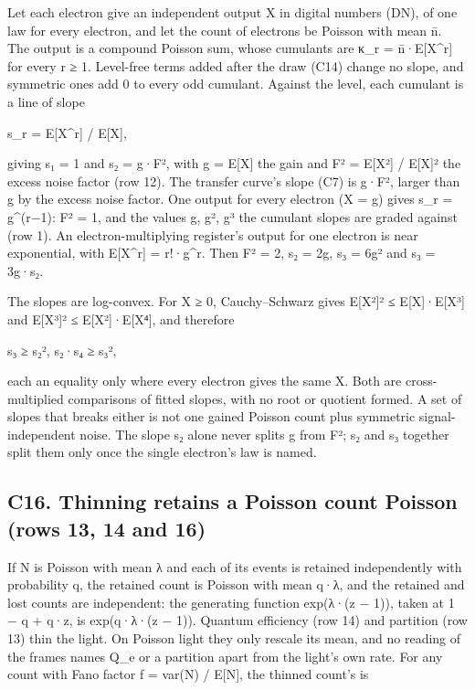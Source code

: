 Let each electron give an independent output X in digital numbers (DN), of one law for every electron, and let the count of electrons be Poisson with mean n̄. The output is a compound Poisson sum, whose cumulants are κ\_\allowbreak{}r = n̄·E[X\textasciicircum{}r] for every r ≥ 1. Level-free terms added after the draw (C14) change no slope, and symmetric ones add 0 to every odd cumulant. Against the level, each cumulant is a line of slope

s\_\allowbreak{}r = E[X\textasciicircum{}r] / E[X],

giving s₁ = 1 and s₂ = g·F², with g = E[X] the gain and F² = E[X²] / E[X]² the excess noise factor (row 12). The transfer curve's slope (C7) is g·F², larger than g by the excess noise factor. One output for every electron (X = g) gives s\_\allowbreak{}r = g\textasciicircum{}(r−1): F² = 1, and the values g, g², g³ the cumulant slopes are graded against (row 1). An electron-multiplying register's output for one electron is near exponential, with E[X\textasciicircum{}r] = r!·g\textasciicircum{}r. Then F² = 2, s₂ = 2g, s₃ = 6g² and s₃ = 3g·s₂.

The slopes are log-convex. For X ≥ 0, Cauchy–Schwarz gives E[X²]² ≤ E[X]·E[X³] and E[X³]² ≤ E[X²]·E[X⁴], and therefore

s₃ ≥ s₂²,  s₂·s₄ ≥ s₃²,

each an equality only where every electron gives the same X. Both are cross-multiplied comparisons of fitted slopes, with no root or quotient formed. A set of slopes that breaks either is not one gained Poisson count plus symmetric signal-independent noise. The slope s₂ alone never splits g from F²; s₂ and s₃ together split them only once the single electron's law is named.

\subsection{\texorpdfstring{C16. Thinning retains a Poisson count Poisson (rows 13, 14 and 16)}{C16. Thinning retains a Poisson count Poisson (rows 13, 14 and 16)}}

If N is Poisson with mean λ and each of its events is retained independently with probability q, the retained count is Poisson with mean q·λ, and the retained and lost counts are independent: the generating function exp(λ·(z − 1)), taken at 1 − q + q·z, is exp(q·λ·(z − 1)). Quantum efficiency (row 14) and partition (row 13) thin the light. On Poisson light they only rescale its mean, and no reading of the frames names Q\_\allowbreak{}e or a partition apart from the light's own rate. For any count with Fano factor f = var(N) / E[N], the thinned count's is

